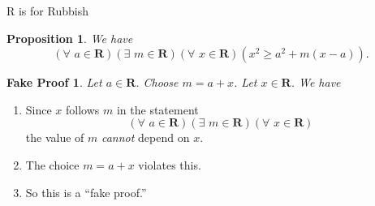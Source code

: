 \documentclass[usenames,dvipsnames,fleqn,leqno,10pt, pdflatex]{beamer}
\newcommand{\reals}{\mathbf{R}}
\newenvironment{PenList}{
  \begin{enumerate}[\textcolor{UNK-blue}{\PencilRightDown}]
    \addtolength{\itemsep}{-0.0\itemsep}}
  {\end{enumerate}}
\newtheorem{myprop}{Proposition}
\newtheorem{fakeproof}{Fake Proof}
\begin{document}
\begin{frame}{R is for Rubbish}

   \begin{myprop} We have
      $$
      \left(\forall \,\, a \in \reals\right)\left(\exists \,\, m \in \reals\right)\left (\forall \,\, x \in \reals \right) 
      \left(x^2 \geq a^2 + m (x-a) \right).
      $$
   \end{myprop}
      
      \begin{fakeproof}Let $a \in \reals$. Choose $m = a+x$. Let $x \in \reals$. We have
      \end{fakeproof}


\begin{PenList}
\item Since $x$ follows $m$ in the statement
$$
\left(\forall \,\, a \in \reals\right)\left(\exists \,\, m \in \reals\right)\left(\forall \,\, x \in \reals \right) 
$$
the value of $m$ \emph{cannot} depend on $x$.  

\item The choice $m = a+x$ violates this.

\item So this is a ``fake proof.''
\end{PenList}  

\end{frame}
\end{document}
